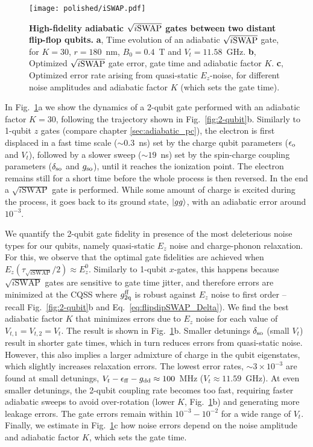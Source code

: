 \begin{figure}[h]
	\centering
	\texttt{[image: polished/iSWAP.pdf]}
	\caption[High-fidelity adiabatic $\sqrt{i{\rm SWAP}}$ gates between two distant flip-flop qubits]{\textbf{High-fidelity adiabatic $\sqrt{i{\rm SWAP}}$ gates between two distant flip-flop qubits.}
		\textbf{a}, Time evolution of an adiabatic $\sqrt{i \rm SWAP}$ gate, for $K=30$, $r=180$~nm, $B_0=0.4$~T and $V_t=11.58$~GHz.
		\textbf{b}, Optimized $\sqrt{i{\rm SWAP}}$ gate error, gate time and adiabatic factor $K$.
		\textbf{c}, Optimized error rate arising from quasi-static $E_z$-noise, for different noise amplitudes and adiabatic factor $K$ (which sets the gate time).}
	\label{fig:iSWAP}
\end{figure}


In Fig.~\ref{fig:iSWAP}a we show the dynamics of a 2-qubit gate performed with an adiabatic factor $K=30$, following the trajectory shown in Fig.~\ref{fig:2-qubit}b. Similarly to 1-qubit $z$ gates (compare chapter \ref{sec:adiabatic_pc}), the electron is first displaced in a fast time scale ($\sim0.3$~ns) set by the charge qubit parameters ($\epsilon_{\rm o}$ and $V_t$), followed by a slower sweep ($\sim19$~ns) set by the spin-charge coupling parameters ($\delta_{\rm so}$ and $g_{\rm so}$), until it reaches the ionization point. The electron remains still for a short time before the whole process is then reversed. In the end a $\sqrt{i\mathrm{SWAP}}$ gate is performed. While some amount of charge is excited during the process, it goes back to its ground state, $\ket{gg}$, with an adiabatic error around $10^{-3}$.

We quantify the 2-qubit gate fidelity in presence of the most deleterious noise types for our qubits, namely quasi-static $E_z$ noise and charge-phonon relaxation. For this, we observe that the optimal gate fidelities are achieved when $E_z(\tau_{\sqrt{i\mathrm{SWAP}}}/2)\approx E_z^0$. Similarly to 1-qubit $x$-gates, this happens because $\sqrt{i\mathrm{SWAP}}$ gates are sensitive to gate time jitter, and therefore errors are minimized at the CQSS where $g_{\rm 2q}^{\rm ff}$ is robust against $E_z$ noise to first order -- recall Fig.~\ref{fig:2-qubit}b and Eq.~\ref{eq:flipdipSWAP_Delta}). We find the best adiabatic factor $K$ that minimizes errors due to $E_z$ noise for each value of $V_{t,1}=V_{t,2}=V_t$. The result is shown in Fig.~\ref{fig:iSWAP}b. Smaller detunings $\delta_{\rm so}$ (small $V_t$) result in shorter gate times, which in turn reduces errors from quasi-static noise. However, this also implies a larger admixture of charge in the qubit eigenstates, which slightly increases relaxation errors. The lowest error rates, $\sim3\times10^{-3}$ are found at small detunings, $V_t-\epsilon_{\rm ff}-g_{\rm dd}\approx 100$~MHz ($V_t\approx11.59$~GHz). At even smaller detunings, the 2-qubit coupling rate becomes too fast, requiring faster adiabatic sweeps to avoid over-rotation (lower $K$, Fig.~\ref{fig:iSWAP}b) and generating more leakage errors. The gate errors remain within $10^{-3}-10^{-2}$ for a wide range of $V_t$. Finally, we estimate in Fig.~\ref{fig:iSWAP}c how noise errors depend on the noise amplitude and adiabatic factor $K$, which sets the gate time.

